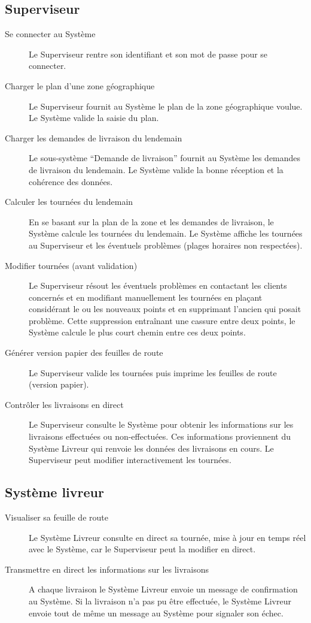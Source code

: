 \subsection{Superviseur}
\begin{description}
\item [Se connecter au Système]Le Superviseur rentre son identifiant et son mot de passe pour se connecter.
\item [Charger le plan d’une zone géographique]Le Superviseur fournit au Système le plan de la zone géographique voulue. Le Système valide la saisie du plan.
\item [Charger les demandes de livraison du lendemain]Le sous-système “Demande de livraison” fournit au Système les demandes de livraison du lendemain. Le Système valide la bonne réception et la cohérence des données. 
\item [Calculer les tournées du lendemain]En se basant sur la plan de la zone et les demandes de livraison, le Système calcule les tournées du lendemain. Le Système affiche les tournées au Superviseur et les éventuels problèmes (plages horaires non respectées).
\item [Modifier tournées (avant validation)]Le Superviseur résout les éventuels problèmes en contactant les clients concernés et en modifiant manuellement les tournées en plaçant considérant le ou les nouveaux points et en supprimant l’ancien qui posait problème. Cette suppression entraînant une cassure entre deux points, le Système calcule le plus court chemin entre ces deux points.
\item [Générer version papier des feuilles de route] Le Superviseur valide les tournées puis imprime les feuilles de route (version papier).
\item [Contrôler les livraisons en direct] Le Superviseur consulte le Système pour obtenir les informations sur les livraisons effectuées ou non-effectuées. Ces informations proviennent du Système Livreur qui renvoie les données des livraisons en cours.
Le Superviseur peut modifier interactivement les tournées.
\end{description}
\subsection{Système livreur}
\begin{description}
\item [Visualiser sa feuille de route]Le Système Livreur consulte en direct sa tournée, mise à jour en temps réel avec le Système, car le Superviseur peut la modifier en direct.
\item [Transmettre en direct les informations sur les livraisons]A chaque livraison le Système Livreur envoie un message de confirmation au Système. Si la livraison n’a pas pu être effectuée, le Système Livreur envoie tout de même un message au Système pour signaler son échec.


\end{description}